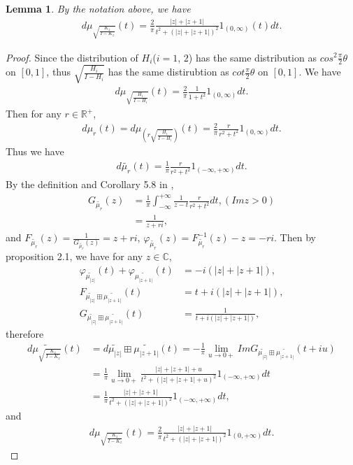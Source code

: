 \documentclass{amsart}
\newcommand{\C}{\mathbb C} %
\newcommand{\R}{\mathbb R}  %
\newtheorem{lemma}{Lemma}[section]
\begin{document}
\begin{lemma}
By the notation above, we have
\begin{align*}
d \mu_{\sqrt{\frac{K_z}{I-K_z}}}(t) = \frac{2}{\pi}\frac{|z|+|z+1|}{t^2 + (|z|+|z+1|)^2} 1_{(0, \infty)}(t) dt .
\end{align*}
\end{lemma}
\begin{proof}
Since the distribution of $H_i$($i = 1$, $2$) has the same distribution as $cos^2\frac{\pi}{2}\theta$ on $[0, 1]$, thus $\sqrt{\frac{H_i}{I - H_i}}$ has
the same distirubtion as $cot\frac{\pi}{2}\theta$ on $[0, 1]$. We have
\begin{align*}
d\mu_{\sqrt{\frac{H_i}{I - H_i}}}(t) = \frac{2}{\pi}\frac{1}{1+t^2} 1_{(0, \infty)} dt.
\end{align*}
Then for any $r \in \R^{+}$,
\begin{align*}
d\mu_r(t) = d\mu_{(r\sqrt{\frac{H_i}{I - H_i}})}(t) = \frac{2}{\pi}\frac{r}{r^2+t^2} 1_{(0, \infty)} dt.
\end{align*}
Thus we have
\begin{align*}
d\widetilde{\mu_r}(t) = \frac{1}{\pi}\frac{r}{r^2+t^2} 1_{(-\infty, +\infty)} dt.
\end{align*}
By the definition and Corollary 5.8 in \cite{HV},
\begin{align*}
G_{\widetilde{\mu_r}}(z) &= \frac{1}{\pi}\int^{+\infty}_{-\infty} \frac{1}{z-t}\frac{r}{r^2+t^2}dt , (Imz > 0) \\
                            &= \frac{1}{z+ri},
\end{align*}
and $F_{\widetilde{\mu_r}}(z) = \frac{1}{G_{\widetilde{\mu_r}}(z)} = z +ri$, $\varphi_{\widetilde{\mu_r}}(z) =
F^{-1}_{\widetilde{\mu_r}}(z) -z = -ri$. Then by proposition 2.1, we have for any $z \in \C$,
\begin{align*}
\varphi_{\widetilde{\mu_{|z|}}}(t) + \varphi_{\widetilde{\mu_{|z+1|}}}(t) &= -i(|z| + |z+1|),\\
F_{\widetilde{\mu_{|z|}}\boxplus \widetilde{\mu_{|z+1|}}}(t) &= t+ i(|z| + |z+1|),\\
G_{\widetilde{\mu_{|z|}}\boxplus \widetilde{\mu_{|z+1|}}}(t) &= \frac{1}{t+ i(|z| + |z+1|)},
\end{align*}
therefore
\begin{align*}
d \widetilde{\mu_{\sqrt{\frac{K_z}{I-K_z}}}}(t) &= d\widetilde{\mu_{|z|}}\boxplus \widetilde{\mu_{|z+1|}}(t) =
- \frac{1}{\pi} \lim_{u \rightarrow 0+} Im G_{\widetilde{\mu_{|z|}}\boxplus \widetilde{\mu_{|z+1|}}}(t + iu) \\
&= \frac{1}{\pi}\lim_{u \rightarrow 0+} \frac{|z|+|z+1| + u}{t^2 + (|z|+|z+1|+u)^2} 1_{(-\infty, +\infty)}dt \\
&= \frac{1}{\pi}\frac{|z|+|z+1|}{t^2 + (|z|+|z+1|)^2}1_{(-\infty, +\infty)}dt,
\end{align*}
and
\begin{align*}
d \mu_{\sqrt{\frac{K_z}{I-K_z}}}(t) = \frac{2}{\pi}\frac{|z|+|z+1|}{t^2 + (|z|+|z+1|)^2}1_{(0, +\infty)}dt.
\end{align*}
\end{proof}
\end{document}
